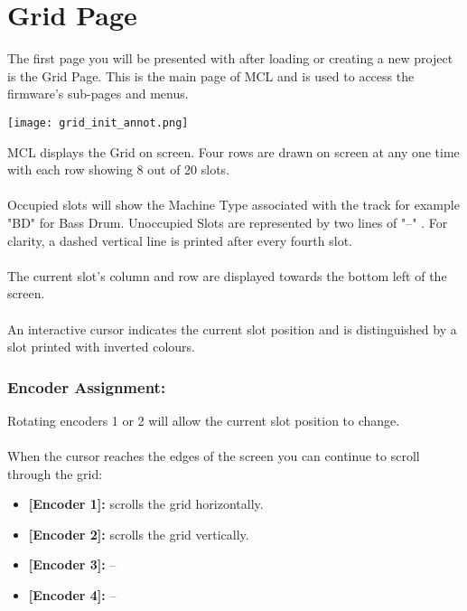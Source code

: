 
\chapter{Grid Page}
The first page you will be presented with after loading or creating a new project is the Grid Page. This is the main page of MCL and is used to access the firmware's sub-pages and menus.

\begin{center}
	\texttt{[image: grid\_init\_annot.png]}
\end{center}
MCL displays the Grid on screen. Four rows are drawn on screen at any one time with each row showing 8 out of 20 slots.\\
\\
Occupied slots will show the Machine Type associated with the track for example "BD" for Bass Drum. Unoccupied Slots are represented by two lines of "--" . For clarity, a dashed vertical line is printed after every fourth slot. \\
\\
The current slot's column and row are displayed towards the bottom left of the screen.\\
\\
An interactive cursor indicates the current slot position and is distinguished by a slot printed with inverted colours.\\
\subsection{Encoder Assignment:}
Rotating encoders 1 or 2 will allow the current slot position to change.\\
\\
When the cursor reaches the edges of the screen you can continue to scroll through the grid:
\begin{itemize}
	\item \textbf{[Encoder 1]:} scrolls the grid horizontally.
	\item \textbf{[Encoder 2]:} scrolls the grid vertically.
	\item \textbf{[Encoder 3]:} --
	\item \textbf{[Encoder 4]:} --
\end{itemize}


